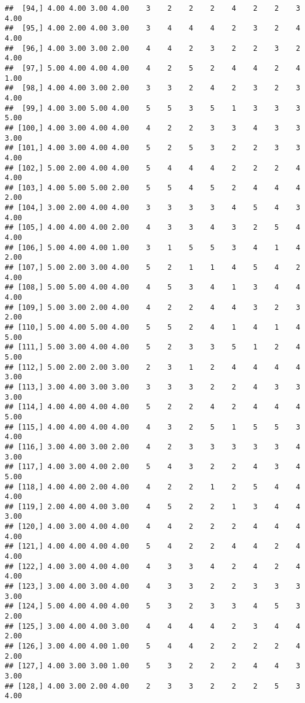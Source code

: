 \documentclass[]{article}
\begin{document}
\begin{verbatim}
##  [94,] 4.00 4.00 3.00 4.00    3    2    2    2    4    2    2    3 4.00
##  [95,] 4.00 2.00 4.00 3.00    3    4    4    4    2    3    2    4 4.00
##  [96,] 4.00 3.00 3.00 2.00    4    4    2    3    2    2    3    2 4.00
##  [97,] 5.00 4.00 4.00 4.00    4    2    5    2    4    4    2    4 1.00
##  [98,] 4.00 4.00 3.00 2.00    3    3    2    4    2    3    2    3 4.00
##  [99,] 4.00 3.00 5.00 4.00    5    5    3    5    1    3    3    3 5.00
## [100,] 4.00 3.00 4.00 4.00    4    2    2    3    3    4    3    3 3.00
## [101,] 4.00 3.00 4.00 4.00    5    2    5    3    2    2    3    3 4.00
## [102,] 5.00 2.00 4.00 4.00    5    4    4    4    2    2    2    4 4.00
## [103,] 4.00 5.00 5.00 2.00    5    5    4    5    2    4    4    4 2.00
## [104,] 3.00 2.00 4.00 4.00    3    3    3    3    4    5    4    3 4.00
## [105,] 4.00 4.00 4.00 2.00    4    3    3    4    3    2    5    4 4.00
## [106,] 5.00 4.00 4.00 1.00    3    1    5    5    3    4    1    4 2.00
## [107,] 5.00 2.00 3.00 4.00    5    2    1    1    4    5    4    2 4.00
## [108,] 5.00 5.00 4.00 4.00    4    5    3    4    1    3    4    4 4.00
## [109,] 5.00 3.00 2.00 4.00    4    2    2    4    4    3    2    3 2.00
## [110,] 5.00 4.00 5.00 4.00    5    5    2    4    1    4    1    4 5.00
## [111,] 5.00 3.00 4.00 4.00    5    2    3    3    5    1    2    4 5.00
## [112,] 5.00 2.00 2.00 3.00    2    3    1    2    4    4    4    4 3.00
## [113,] 3.00 4.00 3.00 3.00    3    3    3    2    2    4    3    3 3.00
## [114,] 4.00 4.00 4.00 4.00    5    2    2    4    2    4    4    4 5.00
## [115,] 4.00 4.00 4.00 4.00    4    3    2    5    1    5    5    3 4.00
## [116,] 3.00 4.00 3.00 2.00    4    2    3    3    3    3    3    4 3.00
## [117,] 4.00 3.00 4.00 2.00    5    4    3    2    2    4    3    4 5.00
## [118,] 4.00 4.00 2.00 4.00    4    2    2    1    2    5    4    4 4.00
## [119,] 2.00 4.00 4.00 3.00    4    5    2    2    1    3    4    4 3.00
## [120,] 4.00 3.00 4.00 4.00    4    4    2    2    2    4    4    4 4.00
## [121,] 4.00 4.00 4.00 4.00    5    4    2    2    4    4    2    4 4.00
## [122,] 4.00 3.00 4.00 4.00    4    3    3    4    2    4    2    4 4.00
## [123,] 3.00 4.00 3.00 4.00    4    3    3    2    2    3    3    3 3.00
## [124,] 5.00 4.00 4.00 4.00    5    3    2    3    3    4    5    3 2.00
## [125,] 3.00 4.00 4.00 3.00    4    4    4    4    2    3    4    4 2.00
## [126,] 3.00 4.00 4.00 1.00    5    4    4    2    2    2    2    4 2.00
## [127,] 4.00 3.00 3.00 1.00    5    3    2    2    2    4    4    3 3.00
## [128,] 4.00 3.00 2.00 4.00    2    3    3    2    2    2    5    3 4.00

\end{verbatim}
\end{document}
